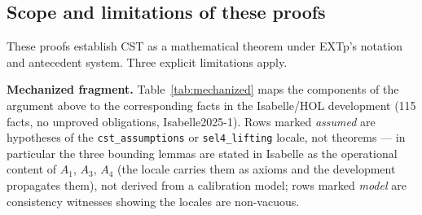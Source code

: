 \documentclass[conference]{IEEEtran}
\begin{document}
\subsection{Scope and limitations of these proofs}

These proofs establish CST as a mathematical theorem under EXTp's
notation and antecedent system. Three explicit limitations apply.

\textbf{Mechanized fragment.} Table~\ref{tab:mechanized} maps the
components of the argument above to the corresponding facts in the
Isabelle/HOL development (115 facts, no unproved obligations,
Isabelle2025-1). Rows marked \emph{assumed} are hypotheses of the
\texttt{cst\_assumptions} or \texttt{sel4\_lifting} locale, not
theorems --- in particular the three bounding lemmas are stated in
Isabelle as the operational content of $A_1$, $A_3$, $A_4$ (the
locale carries them as axioms and the development propagates them),
not derived from a calibration model; rows marked \emph{model} are consistency witnesses
showing the locales are non-vacuous.
\end{document}
